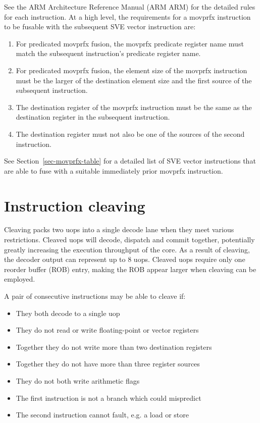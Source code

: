 \documentclass{article}
\begin{document}
See the ARM Architecture Reference Manual (ARM ARM) for the detailed
rules for each instruction. At a high level, the requirements for
a movprfx instruction to be fusable with the subsequent SVE vector
instruction are:

\begin{enumerate}
  \item For predicated movprfx fusion, the movprfx predicate register name
    must match the subsequent instruction's predicate register name.
  \item For predicated movprfx fusion, the element size of the movprfx
    instruction must be the larger of the destination element size and
    the first source of the subsequent instruction.
  \item The destination register of the movprfx instruction must be
    the same as the destination register in the subsequent
    instruction.
  \item The destination register must not also be one of the sources
    of the second instruction.
\end{enumerate}

See Section~\ref{sec-movprfx-table} for a detailed list of SVE vector
instructions that are able to fuse with a suitable immediately prior
movprfx instruction.

\section{Instruction cleaving}

Cleaving packs two uops into a single decode lane when they meet
various restrictions. Cleaved uops will decode, dispatch and commit
together, potentially greatly increasing the execution throughput of
the core. As a result of cleaving, the decoder output can represent up
to 8 uops. Cleaved uops require only one reorder buffer (ROB) entry,
making the ROB appear larger when cleaving can be employed.

A pair of consecutive instructions may be able to cleave if:
\begin{itemize}
\item They both decode to a single uop
\item They do not read or write floating-point or vector registers
\item Together they do not write more than two destination registers
\item Together they do not have more than three register sources
\item They do not both write arithmetic flags
\item The first instruction is not a branch which could mispredict
\item The second instruction cannot fault, e.g. a load or store
\end{itemize}
\end{document}
